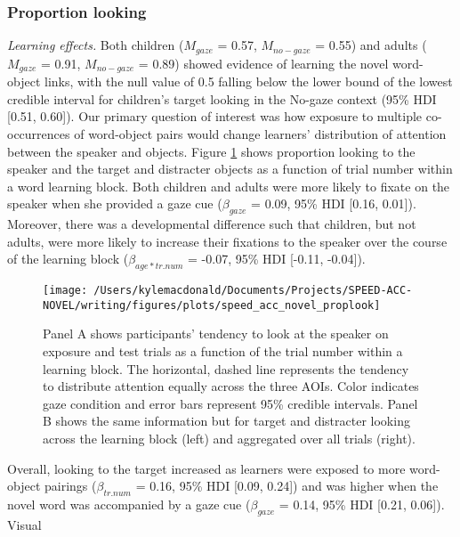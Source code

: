\documentclass[oneside]{report}
\begin{document}
\subsubsection{Proportion looking}\label{proportion-looking}

\emph{Learning effects.} Both children (\(M_{gaze}\) = 0.57,
\(M_{no-gaze}\) = 0.55) and adults (\(M_{gaze}\) = 0.91, \(M_{no-gaze}\)
= 0.89) showed evidence of learning the novel word-object links, with
the null value of 0.5 falling below the lower bound of the lowest
credible interval for children's target looking in the No-gaze context
(95\% HDI {[}0.51, 0.60{]}). Our primary question of interest was how
exposure to multiple co-occurrences of word-object pairs would change
learners' distribution of attention between the speaker and objects.
Figure \ref{fig:san-prop-looking-plot} shows proportion looking to the
speaker and the target and distracter objects as a function of trial
number within a word learning block. Both children and adults were more
likely to fixate on the speaker when she provided a gaze cue
(\(\beta_{gaze}\) = 0.09, 95\% HDI {[}0.16, 0.01{]}). Moreover, there
was a developmental difference such that children, but not adults, were
more likely to increase their fixations to the speaker over the course
of the learning block (\(\beta_{age*tr.num}\) = -0.07, 95\% HDI
{[}-0.11, -0.04{]}).
\begin{figure}[!t]

{\centering \texttt{[image: /Users/kylemacdonald/Documents/Projects/SPEED-ACC-NOVEL/writing/figures/plots/speed\_acc\_novel\_proplook]} 

}

\caption[Proportion looking to speaker and objects in Experiment 5.3.]{Panel A shows participants’ tendency to look at the speaker on exposure and test trials as a function of the trial number within a learning block. The horizontal, dashed line represents the tendency to distribute attention equally across the three AOIs. Color indicates gaze condition and error bars represent 95\% credible intervals. Panel B shows the same information but for target and distracter looking across the learning block (left) and aggregated over all trials (right).}\label{fig:san-prop-looking-plot}
\end{figure}
Overall, looking to the target increased as learners were exposed to
more word-object pairings (\(\beta_{tr.num}\) = 0.16, 95\% HDI {[}0.09,
0.24{]}) and was higher when the novel word was accompanied by a gaze
cue (\(\beta_{gaze}\) = 0.14, 95\% HDI {[}0.21, 0.06{]}). Visual
\end{document}
